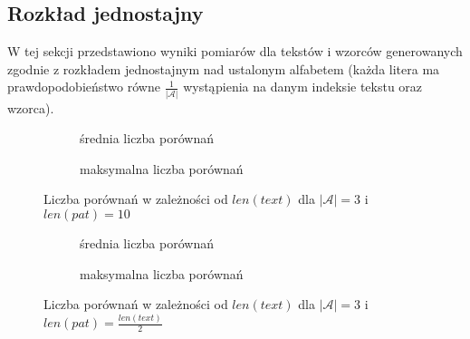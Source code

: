 \FloatBarrier
\subsection{Rozkład jednostajny}
W tej sekcji przedstawiono wyniki pomiarów dla tekstów i wzorców generowanych zgodnie z rozkładem jednostajnym nad ustalonym alfabetem (każda litera ma prawdopodobieństwo równe $\frac{1}{|\mathcal{A}|}$ wystąpienia na danym indeksie tekstu oraz wzorca).

\begin{figure}[htb]
    \centering
    \begin{subfigure}[b]{0.49\textwidth}
        \centering
        
        \caption{średnia liczba porównań}
        \label{fig:result_alph_uni_3_pat_10_plot_avg_100}
    \end{subfigure}
    \hfill
    \begin{subfigure}[b]{0.49\textwidth}
        \centering
        
        \caption{maksymalna liczba porównań}
        \label{fig:result_alph_uni_3_pat_10_plot_max_100}
    \end{subfigure}
    \hfill
    \caption{Liczba porównań w zależności od $len(text)$ dla $|\mathcal{A}| = 3$ i $len(pat) = 10$}
    \label{fig:result_alph_uni_3_pat_10}
\end{figure}

\begin{figure}[htb]
    \centering
    \begin{subfigure}[b]{0.49\textwidth}
        \centering
        
        \caption{średnia liczba porównań}
        \label{fig:result_alph_uni_3_pat_len(text)2_plot_avg_100}
    \end{subfigure}
    \hfill
    \begin{subfigure}[b]{0.49\textwidth}
        \centering
        
        \caption{maksymalna liczba porównań}
        \label{fig:result_alph_uni_3_pat_len(text)2_plot_max_100}
    \end{subfigure}
    \hfill
    \caption{Liczba porównań w zależności od $len(text)$ dla $|\mathcal{A}| = 3$ i $len(pat) = \frac{len(text)}{2}$}
    \label{fig:result_alph_uni_3_pat_len(text)2}
\end{figure}

